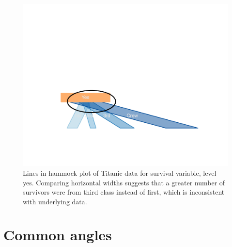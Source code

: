 \documentclass[journal]{vgtc}\usepackage{graphicx, color}
\begin{document}
\begin{figure}[htbp]
\centering
\includegraphics[width = .75\linewidth]{images/grid-hammock-zoom}
\caption{\label{hammock_zoom}Lines in hammock plot of Titanic data for survival variable, level yes. Comparing horizontal widths suggests that a greater number of survivors were from third class instead of first, which is inconsistent with underlying data.}
\end{figure}


%

\section{Common angles}
\end{document}
